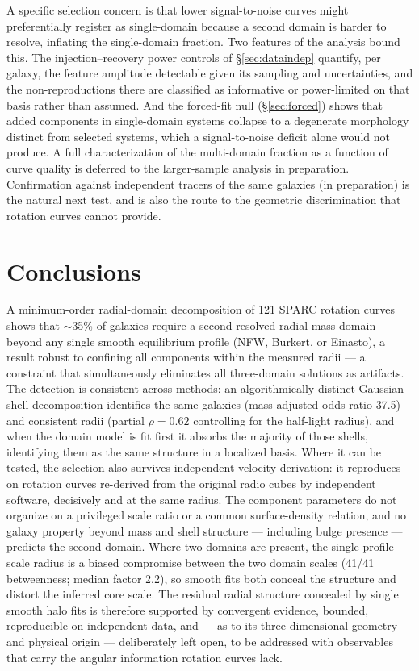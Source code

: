 \documentclass[twocolumn]{aastex701}
\begin{document}
A specific selection concern is that lower signal-to-noise curves might preferentially
register as single-domain because a second domain is harder to resolve, inflating the
single-domain fraction. Two features of the analysis bound this. The
injection--recovery power controls of \S\ref{sec:dataindep} quantify, per galaxy, the
feature amplitude detectable given its sampling and uncertainties, and the
non-reproductions there are classified as informative or power-limited on that basis
rather than assumed. And the forced-fit null (\S\ref{sec:forced}) shows that added
components in single-domain systems collapse to a degenerate morphology distinct from
selected systems, which a signal-to-noise deficit alone would not produce. A full
characterization of the multi-domain fraction as a function of curve quality is
deferred to the larger-sample analysis in preparation.
Confirmation against independent tracers of the same galaxies (in preparation)
is the natural next test, and is also the route to the geometric discrimination
that rotation curves cannot provide.

\section{Conclusions} \label{sec:conclusions}

A minimum-order radial-domain decomposition of 121 SPARC rotation curves
shows that $\sim$35\% of galaxies require a second resolved radial mass domain beyond any
single smooth equilibrium profile (NFW, Burkert, or Einasto), a result robust
to confining all components within the measured radii --- a constraint that
simultaneously eliminates all three-domain solutions as artifacts. The
detection is consistent across methods: an algorithmically distinct Gaussian-shell decomposition
identifies the same galaxies (mass-adjusted odds ratio 37.5) and consistent
radii (partial $\rho = 0.62$ controlling for the half-light radius), and when
the domain model is fit first it absorbs the majority of those shells,
identifying them as the same structure in a localized basis. Where it can be
tested, the selection also survives independent velocity derivation: it reproduces on rotation curves
re-derived from the original radio cubes by independent software, decisively and
at the same radius. The
component parameters do not organize on a privileged scale ratio or a common
surface-density relation, and no galaxy property beyond mass and shell
structure --- including bulge presence --- predicts the second domain. Where
two domains are present, the single-profile scale radius is a biased
compromise between the two domain scales (41/41 betweenness; median factor
2.2), so smooth fits both conceal the structure and distort the inferred
core scale. The residual radial structure concealed
by single smooth halo fits is therefore supported by convergent evidence,
bounded, reproducible on independent data, and --- as to its three-dimensional
geometry and physical origin --- deliberately left open, to be addressed with
observables that carry the angular information rotation curves lack.
\end{document}
